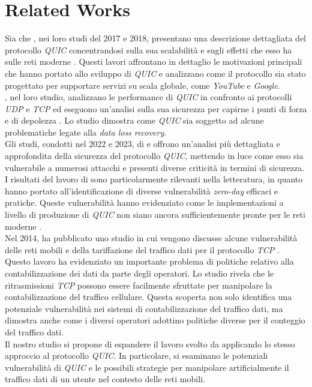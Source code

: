 \chapter{Related Works}
\label{cap:RelatedWorks}

Sia  che  , nei loro studi del 2017 e 2018, presentano una descrizione dettagliata
del protocollo \emph{QUIC} concentrandosi sulla sua scalabilità e sugli effetti che esso ha sulle reti moderne \cite{article:handshake,article:wild}.
Questi lavori affrontano in dettaglio le motivazioni principali che hanno portato allo sviluppo di \emph{QUIC} e analizzano come il protocollo sia stato progettato per 
supportare servizi su scala globale, come \emph{YouTube} e \emph{Google}. \\
, nel loro studio, analizzano le performance di \emph{QUIC} in confronto ai protocolli \emph{UDP} e \emph{TCP} ed eseguono un'analisi sulla sua sicurezza 
per capirne i punti di forza e di depolezza \cite{article:securityAnaP}. Lo studio dimostra come \emph{QUIC} sia soggetto ad alcune problematiche legate alla \emph{data loss recovery}.
\\
Gli studi, condotti nel 2022 e 2023, di \citeauthor{article:QuicAtt} e  offrono un'analisi più dettagliata e approfondita
della sicurezza del protocollo \emph{QUIC}, mettendo in luce come esso sia vulnerabile a numerosi attacchi e presenti diverse criticità in termini di sicurezza.
I risultati del lavoro di \citeauthor{article:QuicAtt} sono particolarmente rilevanti nella letteratura, in quanto hanno portato all'identificazione di diverse vulnerabilità \emph{zero-day} efficaci e pratiche.
Queste vulnerabilità hanno evidenziato come le implementazioni a livello di produzione di \emph{QUIC} non siano ancora sufficientemente pronte per le reti moderne \cite{article:QuicAtt,article:forge}.
\\
Nel 2014, \citeauthor{article:cellular} ha pubblicato uno studio in cui vengono discusse alcune vulnerabilità delle reti mobili e della tariffazione del traffico dati 
per il protocollo \emph{TCP} \cite{article:cellular}. Questo lavoro ha evidenziato un importante problema di politiche relativo alla contabilizzazione dei dati da parte degli operatori.
Lo studio rivela che le ritrasmissioni \emph{TCP} possono essere facilmente sfruttate per manipolare la contabilizzazione del traffico cellulare. 
Questa scoperta non solo identifica una potenziale vulnerabilità nei sistemi di contabilizzazione del traffico dati,
ma dimostra anche come i diversi operatori adottino politiche diverse per il conteggio del traffico dati.
\\
Il nostro studio si propone di espandere il lavoro svolto da \citeauthor{article:cellular} applicando lo stesso approccio al protocollo \emph{QUIC}. 
In particolare, si esaminano le potenziali vulnerabilità di \emph{QUIC} e le possibili strategie per manipolare artificialmente il traffico dati di un utente nel contesto delle reti mobili. 